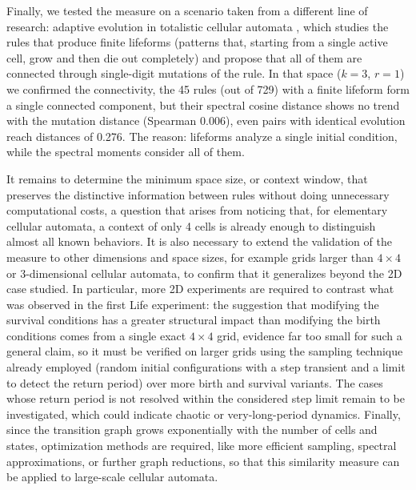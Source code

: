 \documentclass[a4paper,11pt]{article}
\begin{document}
Finally, we tested the measure on a scenario taken from a different line of research: adaptive evolution in totalistic cellular automata \cite{angeles2025_aetca}, which studies the rules that produce finite lifeforms (patterns that, starting from a single active cell, grow and then die out completely) and propose that all of them are connected through single-digit mutations of the rule. In that space ($k=3$, $r=1$) we confirmed the connectivity, the 45 rules (out of 729) with a finite lifeform form a single connected component, but their spectral cosine distance shows no trend with the mutation distance (Spearman $0.006$), even pairs with identical evolution reach distances of 0.276. The reason: lifeforms analyze a single initial condition, while the spectral moments consider all of them.

It remains to determine the minimum space size, or context window, that preserves the distinctive information between rules without doing unnecessary computational costs, a question that arises from noticing that, for elementary cellular automata, a context of only 4 cells is already enough to distinguish almost all known behaviors. It is also necessary to extend the validation of the measure to other dimensions and space sizes, for example grids larger than $4\times 4$ or 3-dimensional cellular automata, to confirm that it generalizes beyond the 2D case studied. In particular, more 2D experiments are required to contrast what was observed in the first Life experiment: the suggestion that modifying the survival conditions has a greater structural impact than modifying the birth conditions comes from a single exact $4\times4$ grid, evidence far too small for such a general claim, so it must be verified on larger grids using the sampling technique already employed (random initial configurations with a step transient and a limit to detect the return period) over more birth and survival variants. The cases whose return period is not resolved within the considered step limit remain to be investigated, which could indicate chaotic or very-long-period dynamics. Finally, since the transition graph grows exponentially with the number of cells and states, optimization methods are required, like more efficient sampling, spectral approximations, or further graph reductions, so that this similarity measure can be applied to large-scale cellular automata.
\end{document}
